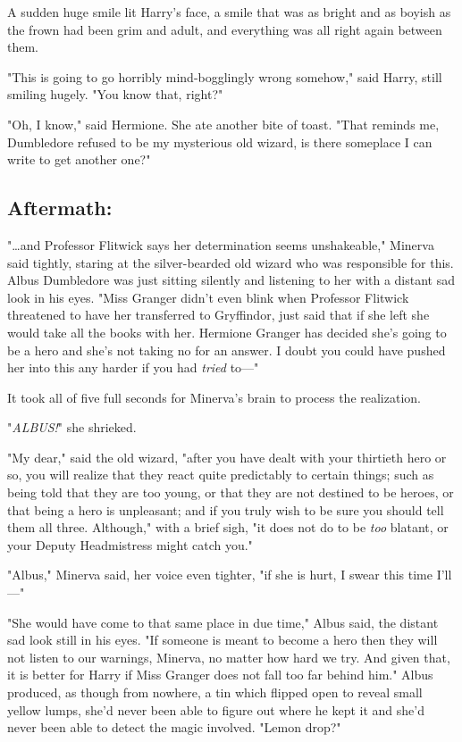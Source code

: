 A sudden huge smile lit Harry's face, a smile that was as bright and as boyish 
as the frown had been grim and adult, and everything was all right again 
between them.

"This is going to go horribly mind-bogglingly wrong somehow," said Harry, still 
smiling hugely. "You know that, right?"

"Oh, I know," said Hermione. She ate another bite of toast. "That reminds me, 
Dumbledore refused to be my mysterious old wizard, is there someplace I can 
write to get another one?"
\sbreak
\vspace{-2\baselineskip}
\subsection{Aftermath:}

"{\ldots}and Professor Flitwick says her determination seems unshakeable," 
Minerva said tightly, staring at the silver-bearded old wizard who was 
responsible for this. Albus Dumbledore was just sitting silently and listening 
to her with a distant sad look in his eyes. "Miss Granger didn't even blink 
when Professor Flitwick threatened to have her transferred to Gryffindor, just 
said that if she left she would take all the books with her. Hermione Granger 
has decided she's going to be a hero and she's not taking no for an answer. I 
doubt you could have pushed her into this any harder if you had \emph{tried} 
to---"

It took all of five full seconds for Minerva's brain to process the realization.

"\emph{ALBUS!}" she shrieked.

"My dear," said the old wizard, "after you have dealt with your thirtieth hero 
or so, you will realize that they react quite predictably to certain things; 
such as being told that they are too young, or that they are not destined to be 
heroes, or that being a hero is unpleasant; and if you truly wish to be sure 
you should tell them all three. Although," with a brief sigh, "it does not do 
to be \emph{too} blatant, or your Deputy Headmistress might catch you."

"Albus," Minerva said, her voice even tighter, "if she is hurt, I swear this 
time I'll---"

"She would have come to that same place in due time," Albus said, the distant 
sad look still in his eyes. "If someone is meant to become a hero then they 
will not listen to our warnings, Minerva, no matter how hard we try. And given 
that, it is better for Harry if Miss Granger does not fall too far behind him." 
Albus produced, as though from nowhere, a tin which flipped open to reveal 
small yellow lumps, she'd never been able to figure out where he kept it and 
she'd never been able to detect the magic involved. "Lemon drop?"

